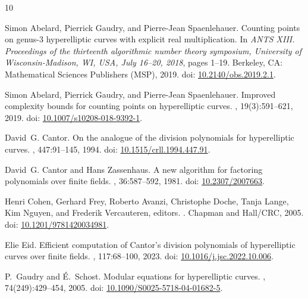 \documentclass[11pt,a4paper]{article}
\theoremstyle{plain}
\theoremstyle{definition}
\theoremstyle{remark}
\begin{document}
\begin{thebibliography}{10}

Simon Abelard, Pierrick Gaudry, and Pierre-Jean Spaenlehauer.
\newblock Counting points on genus-3 hyperelliptic curves with explicit real
  multiplication.
\newblock In {\em ANTS XIII. Proceedings of the thirteenth algorithmic number
  theory symposium, University of Wisconsin-Madison, WI, USA, July 16--20,
  2018}, pages 1--19. Berkeley, CA: Mathematical Sciences Publishers (MSP),
  2019.
\newblock doi:
  \href{https://doi.org/10.2140/obs.2019.2.1}{10.2140/obs.2019.2.1}.

Simon Abelard, Pierrick Gaudry, and Pierre-Jean Spaenlehauer.
\newblock Improved complexity bounds for counting points on hyperelliptic
  curves.
, 19(3):591--621, 2019.
\newblock doi:
  \href{https://doi.org/10.1007/s10208-018-9392-1}{10.1007/s10208-018-9392-1}.

David~G. Cantor.
\newblock On the analogue of the division polynomials for hyperelliptic curves.
, 447:91--145, 1994.
\newblock doi:
  \href{https://doi.org/10.1515/crll.1994.447.91}{10.1515/crll.1994.447.91}.

David~G. Cantor and Hans Zassenhaus.
\newblock A new algorithm for factoring polynomials over finite fields.
, 36:587--592, 1981.
\newblock doi: \href{https://doi.org/10.2307/2007663}{10.2307/2007663}.

Henri Cohen, Gerhard Frey, Roberto Avanzi, Christophe Doche, Tanja Lange, Kim
  Nguyen, and Frederik Vercauteren, editors.
.
\newblock Chapman and Hall/CRC, 2005.
\newblock doi:
  \href{https://doi.org/10.1201/9781420034981}{10.1201/9781420034981}.

Elie Eid.
\newblock Efficient computation of {Cantor}'s division polynomials of
  hyperelliptic curves over finite fields.
, 117:68--100, 2023.
\newblock doi:
  \href{https://doi.org/10.1016/j.jsc.2022.10.006}{10.1016/j.jsc.2022.10.006}.

P.~Gaudry and {\'E}.~Schost.
\newblock Modular equations for hyperelliptic curves.
, 74(249):429--454, 2005.
\newblock doi:
  \href{https://doi.org/10.1090/S0025-5718-04-01682-5}{10.1090/S0025-5718-04-01682-5}.


\end{thebibliography}
\end{document}

